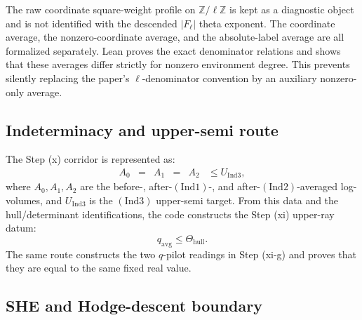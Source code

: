 \documentclass[11pt]{article}
\newcommand{\Lean}{Lean}
\newcommand{\Ind}{\ensuremath{\mathrm{Ind}}}
\theoremstyle{plain}
\theoremstyle{definition}
\theoremstyle{remark}
\begin{document}
The raw coordinate square-weight profile on \(\mathbb{Z}/\ell\mathbb{Z}\) is kept as a
diagnostic object and is not identified with the descended \(|F_\ell|\)
theta exponent.  The coordinate average, the nonzero-coordinate average, and
the absolute-label average are all formalized separately.  \Lean{} proves the exact denominator
relations and shows that these averages differ strictly for nonzero
environment degree.  This prevents silently replacing the paper's
\(\ell\)-denominator convention by an auxiliary nonzero-only average.

\subsection{Indeterminacy and upper-semi route}

The Step (x) corridor is represented as:
\[
\begin{array}{cccccc}
A_0 & = & A_1 & = & A_2 & \le U_{\Ind3},
\end{array}
\]
where \(A_0,A_1,A_2\) are the before-, after-\((\Ind1)\)-, and
after-\((\Ind2)\)-averaged log-volumes, and \(U_{\Ind3}\) is the
\((\Ind3)\) upper-semi target.  From this data and the hull/determinant
identifications, the code constructs the Step (xi) upper-ray datum:
\[
  q_{\mathrm{avg}}\le \Theta_{\mathrm{hull}} .
\]
The same route constructs the two \(q\)-pilot readings in Step (xi-g) and
proves that they are equal to the same fixed real value.

\subsection{SHE and Hodge-descent boundary}
\end{document}
